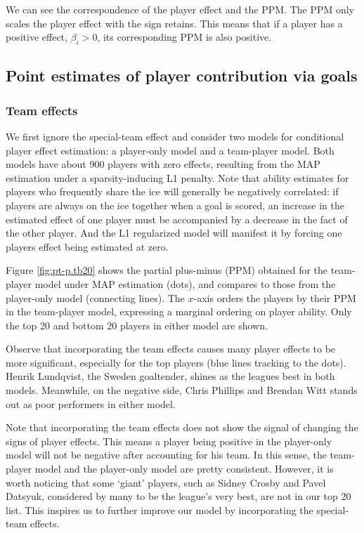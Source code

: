 We can see the correspondence of the player effect and the PPM. The PPM only scales the player effect with the sign retains. This means that if a player has a positive effect, $\beta_i>0$, its corresponding PPM is also positive. 


 
\subsection{Point estimates of player contribution via goals}
\subsubsection{Team effects}
We first ignore the special-team effect and consider two models for conditional player effect estimation: a player-only model and a team-player model. Both models have about 900 players with zero effects, resulting from the MAP estimation under a sparsity-inducing L1 penalty. Note that ability estimates for players who frequently share the ice will generally be negatively correlated: if players are always on the ice together when a goal is scored, an increase in the estimated effect of one player must be accompanied by a decrease in the fact of the other player. And the L1 regularized model will manifest it by forcing one players effect being estimated at zero.

Figure \ref{fig:pt-p.tb20} shows the partial plus-minus (PPM) obtained for the team-player model under MAP estimation (dots), and compares to those from the player-only model (connecting lines). The $x$-axis orders the players by their PPM in the team-player model, expressing a marginal ordering on player ability. Only the top 20 and bottom 20 players in either model are shown. 

Observe that incorporating the team effects causes many player effects to be more significant, especially for the top players (blue lines tracking to the dots). Henrik Lundqvist, the Sweden goaltender, shines as the leagues best in both models. Meanwhile, on the negative side, Chris Phillips and Brendan Witt stands out as poor performers in either model. 

Note that incorporating the team effects does not show the signal of changing the signs of player effects. This means a player being positive in the player-only model will not be negative after accounting for his team. In this sense, the team-player model and the player-only model are pretty consistent. However, it is worth noticing that some `giant' players, such as Sidney Crosby and Pavel Datsyuk, considered by many to be the league's very best, are not in our top 20 list. This inspires us to further improve our model by incorporating the special-team effects. 

